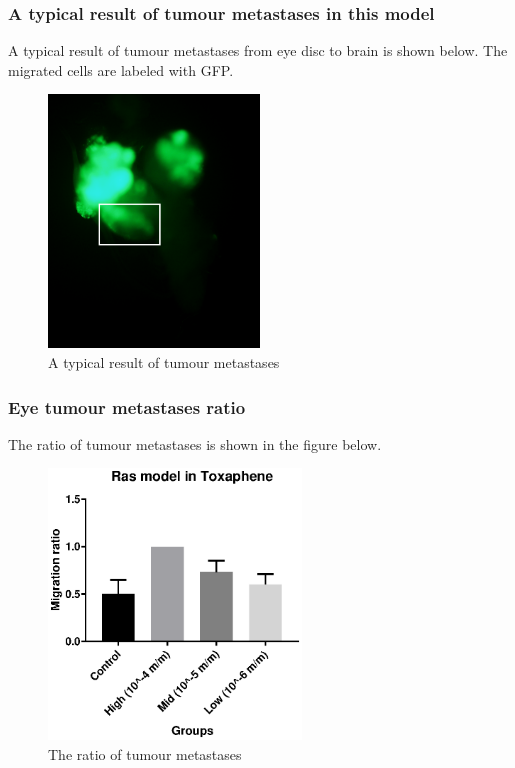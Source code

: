 \subsubsection{A typical result of tumour metastases in this model}
A typical result of tumour metastases from eye disc to brain is shown below. The migrated cells are labeled with GFP.
\begin{figure}[H]
    \centering
    \includegraphics[width=0.5\textwidth,angle=0]{image/VNC.png}
    \caption{A typical result of tumour metastases}
    \label{Eyef}
\end{figure}

\subsubsection{Eye tumour metastases ratio}
The ratio of tumour metastases is shown in the figure below.

\begin{figure}[H]
    \centering
    \includegraphics[width=0.6\textwidth,angle=0]{image/Data2.eps}
    \caption{The ratio of tumour metastases}
    \label{Eye}
\end{figure}

